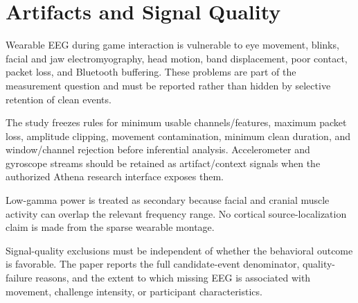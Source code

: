 \section{Artifacts and Signal Quality}

Wearable EEG during game interaction is vulnerable to eye movement, blinks, facial and jaw electromyography, head motion, band displacement, poor contact, packet loss, and Bluetooth buffering. These problems are part of the measurement question and must be reported rather than hidden by selective retention of clean events.

The study freezes rules for minimum usable channels/features, maximum packet loss, amplitude clipping, movement contamination, minimum clean duration, and window/channel rejection before inferential analysis. Accelerometer and gyroscope streams should be retained as artifact/context signals when the authorized Athena research interface exposes them.

Low-gamma power is treated as secondary because facial and cranial muscle activity can overlap the relevant frequency range. No cortical source-localization claim is made from the sparse wearable montage.

Signal-quality exclusions must be independent of whether the behavioral outcome is favorable. The paper reports the full candidate-event denominator, quality-failure reasons, and the extent to which missing EEG is associated with movement, challenge intensity, or participant characteristics.
